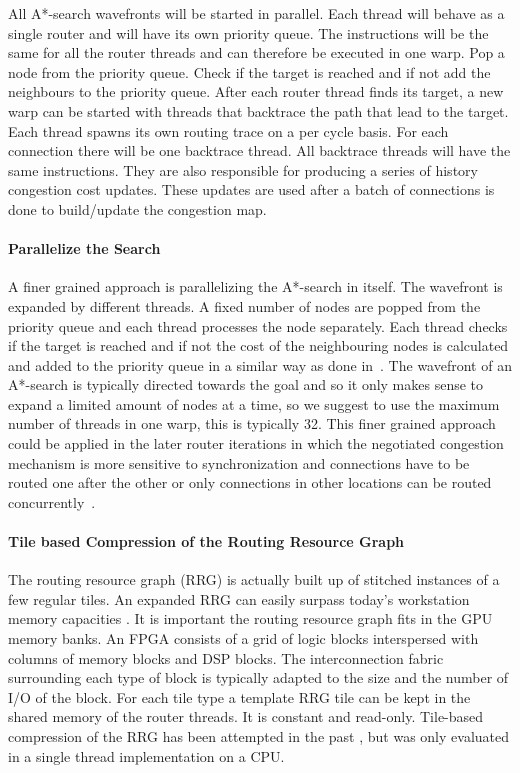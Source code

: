 \documentclass[a4paper,oneside,12pt]{article}
\begin{document}
All A*-search wavefronts will be started in parallel. Each thread will behave as a single router and will have its own priority queue. The instructions will be the same for all the router threads and can therefore be executed in one warp. Pop a node from the priority queue. Check if the target is reached and if not add the neighbours to the priority queue. After each router thread finds its target, a new warp can be started with threads that backtrace the path that lead to the target. Each thread spawns its own routing trace on a per cycle basis. For each connection there will be one backtrace thread. All backtrace threads will have the same instructions. They are also responsible for producing a series of history congestion cost updates. These updates are used after a batch of connections is done to build/update the congestion map.

\paragraph{Parallelize the Search}
A finer grained approach is parallelizing the A*-search in itself. The wavefront is expanded by different threads. A fixed number of nodes are popped from the priority queue and each thread processes the node separately. Each thread checks if the target is reached and if not the cost of the neighbouring nodes is calculated and added to the priority queue in a similar way as done in~\cite{Merrill2015}. The wavefront of an A*-search is typically directed towards the goal and so it only makes sense to expand a limited amount of nodes at a time, so we suggest to use the maximum number of threads in one warp, this is typically 32. This finer grained approach could be applied in the later router iterations in which the negotiated congestion mechanism is more sensitive to synchronization and connections have to be routed one after the other or only connections in other locations can be routed concurrently~\cite{gort2010deterministic}.

\paragraph{Tile based Compression of the Routing Resource Graph}
The routing resource graph (RRG) is actually built up of stitched instances of a few regular tiles. An expanded RRG can easily surpass today's workstation memory capacities \cite{murray2015timing}. It is important the routing resource graph fits in the GPU memory banks.
An FPGA consists of a grid of logic blocks interspersed with columns of memory blocks and DSP blocks. The interconnection fabric surrounding each type of block is typically adapted to the size and the number of I/O of the block. For each tile type a template RRG tile can be kept in the shared memory of the router threads. It is constant and read-only.
Tile-based compression of the RRG has been attempted in the past \cite{chin2007memory}, but was only evaluated in a single thread implementation on a CPU.
\end{document}
